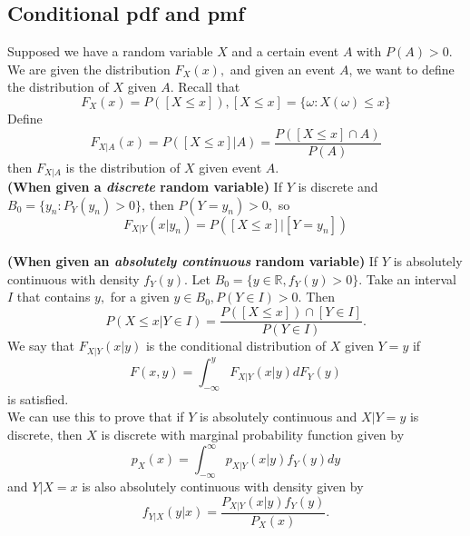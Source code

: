 \documentclass[12pt]{report} \addtolength{\textheight}{2in}
\newcommand{\totalint}{\int_{-\infty}^{\infty}}
\newcommand{\Realnum}{\mathbb{R}}
\begin{document}
\subsection*{Conditional pdf and pmf}
Supposed we have a random variable $X$ and a certain event $A$ with $P(A) > 0.$ We are given the distribution $F_X(x),$ and given an event $A$, we want to define the distribution of $X$ given $A$. Recall that
\begin{displaymath}
F_X(x)=P([X \leq x]), [X \leq x] = \{\omega: X(\omega) \leq x\}
\end{displaymath}
Define 
\begin{displaymath}
F_{X|A}(x) = P([X \leq x]|A) = \frac{P([X \leq x] \cap A)}{P(A)}
\end{displaymath}
then $F_{X|A}$ is the distribution of $X$ given event $A$.\\
\textbf{(When given a \textit{discrete} random variable)} If $Y$ is discrete and $B_0=\{y_n: P_Y(y_n)>0\}$, then $P(Y=y_n) >0,$ so
\begin{displaymath}
F_{X|Y}(x|y_n)=P([X\leq x]| [Y = y_n])
\end{displaymath}\\
\textbf{(When given an \textit{absolutely continuous} random variable) }If $Y$ is absolutely continuous with density $f_Y(y).$ Let $B_0=\{y\in \Realnum, f_Y(y) > 0 \}.$ Take an interval $I$ that contains $y,$ for a given $y\in B_0, P(Y \in I) > 0.$ Then
\begin{displaymath}
P(X\leq x | Y \in I) = \frac{P([X\leq x]) \cap [Y \in I]}{P(Y\in I)}.
\end{displaymath}
We say that $F_{X|Y}(x|y)$ is the conditional distribution of $X$ given $Y=y$ if
\begin{displaymath}
F(x,y)=\int_{-\infty}^{y} F_{X|Y} (x|y) dF_Y(y)
\end{displaymath}
is satisfied.\\
We can use this to prove that if $Y$ is absolutely continuous and $X|Y=y$ is discrete, then $X$ is discrete with marginal probability function given by
\begin{displaymath}
p_X(x)=\totalint p_{X|Y}(x|y) f_Y(y) dy
\end{displaymath}
and $Y|X=x$ is also absolutely continuous with density given by 
\begin{displaymath}
f_{Y|X} (y|x)=\frac{P_{X|Y}(x|y)f_Y(y)}{P_{X}(x)}.
\end{displaymath}
\end{document}
